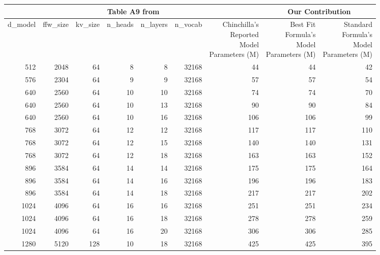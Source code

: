 \begingroup
\centering
\setlength{\tabcolsep}{3pt} %
\footnotesize
\begin{longtable}[h!]
{rrrrrr|r|rr}
\toprule
\multicolumn{7}{c|}{Table A9 from \citet{hoffman2022chinchilla}} & \multicolumn{2}{c}{Our Contribution} \\
\midrule
d\_model &  ffw\_size &  kv\_size &  n\_heads &  n\_layers & n\_vocab & \makecell{Chinchilla's\\Reported\\Model\\Parameters (M)} & \makecell{Best Fit\\Formula's\\Model\\ Parameters (M)} & \makecell{Standard\\Formula's\\Model\\Parameters (M)}\\
\midrule
        512 & 2048 & 64 & 8 & 8 & 32168 & 44 & 44 & 42 \\ 
        576 & 2304 & 64 & 9 & 9 & 32168 & 57 & 57 & 54 \\ 
        640 & 2560 & 64 & 10 & 10 & 32168 & 74 & 74 & 70 \\ 
        640 & 2560 & 64 & 10 & 13 & 32168 & 90 & 90 & 84 \\ 
        640 & 2560 & 64 & 10 & 16 & 32168 & 106 & 106 & 99 \\ 
        768 & 3072 & 64 & 12 & 12 & 32168 & 117 & 117 & 110 \\ 
        768 & 3072 & 64 & 12 & 15 & 32168 & 140 & 140 & 131 \\ 
        768 & 3072 & 64 & 12 & 18 & 32168 & 163 & 163 & 152 \\ 
        896 & 3584 & 64 & 14 & 14 & 32168 & 175 & 175 & 164 \\ 
        896 & 3584 & 64 & 14 & 16 & 32168 & 196 & 196 & 183 \\ 
        896 & 3584 & 64 & 14 & 18 & 32168 & 217 & 217 & 202 \\ 
        1024 & 4096 & 64 & 16 & 16 & 32168 & 251 & 251 & 234 \\ 
        1024 & 4096 & 64 & 16 & 18 & 32168 & 278 & 278 & 259 \\ 
        1024 & 4096 & 64 & 16 & 20 & 32168 & 306 & 306 & 285 \\ 
        1280 & 5120 & 128 & 10 & 18 & 32168 & 425 & 425 & 395 \\ 

\end{longtable}
